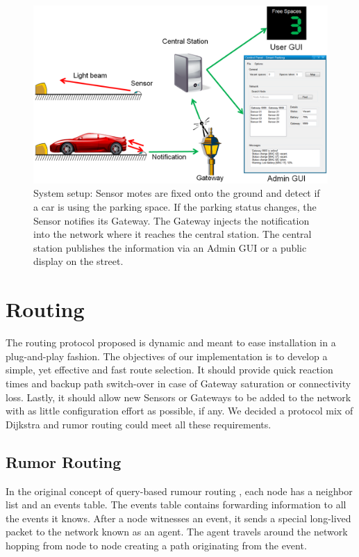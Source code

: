 \begin{figure}
    \centering
    \includegraphics[width=15cm]{images/General_SpaceDetectionAndGUI.png}
	\vspace{-1.5em}
    \caption[System setup and vacant space detection]{System setup: Sensor motes are fixed onto the ground and detect if a car is using the parking space. 
	If the parking status changes, the Sensor notifies its Gateway. 
	The Gateway injects the notification into the network where it reaches the central station. 
	The central station publishes the information via an Admin GUI or a public display on the street.}
    \vspace{-1.5em}
    \label{fig:system_setup}
\end{figure}

\section{Routing}
\label{sec:routing}
The routing protocol proposed is dynamic and meant to ease installation in a plug-and-play fashion. 
The objectives of our implementation is to develop a simple, yet effective and fast route selection. 
It should provide quick reaction times and backup path switch-over in case of Gateway saturation or connectivity loss.
Lastly, it should allow new Sensors or Gateways to be added to the network with as little configuration effort as possible, if any.
We decided a protocol mix of Dijkstra and rumor routing could meet all these requirements.

\bigskip
\subsection{Rumor Routing}
\label{sec:rumor_routing}
In the original concept of query-based rumour routing \cite{rumor_routing_2002}, each node has a neighbor list and an events table. The events table contains forwarding information to all the events it knows. 
After a node witnesses an event, it sends a special long-lived packet to the network known as an agent.
The agent travels around the network hopping from node to node creating a path originating from the event.

